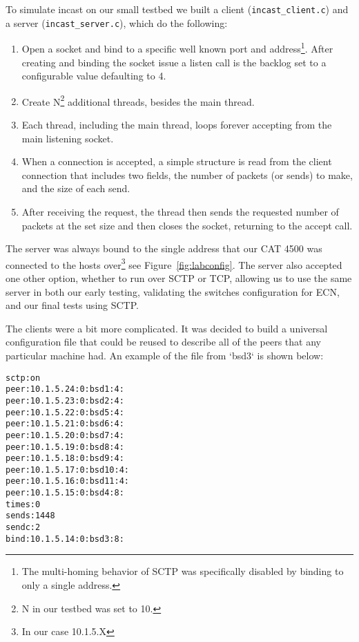 \documentclass[12pt]{article}
\begin{document}
To simulate incast on our small testbed we built a client
(\texttt{incast\_client.c}) and a server (\texttt{incast\_server.c}), 
which  do the following:
\begin{enumerate}

\item Open a socket and bind to a specific well known port and address\footnote{The multi-homing
behavior of SCTP was specifically disabled by binding to only a single address.}. After creating and
binding the socket issue a listen call is the backlog set to a configurable value defaulting to 4.

\item Create N\footnote{N in our testbed was set to 10.} additional threads, besides the main thread.

\item Each thread, including the main thread, loops forever accepting from the main listening socket.

\item When a connection is accepted, a simple structure is read from the client connection that includes two fields, the
number of packets (or sends) to make, and the size of each send.

\item After receiving the request, the thread then sends the requested number of packets at the set
size and then closes the socket, returning to the accept call.

\end{enumerate}

The server
was always bound to the single address that our CAT 4500 was connected to the hosts over\footnote{In our case 10.1.5.X}
see Figure~\ref{fig:labconfig}.
The server also accepted one other option, whether to run over SCTP or
TCP, allowing us to use
the same server in both our early testing, validating the switches configuration for ECN, and our final tests
using SCTP.

The clients were a bit more complicated. It was decided to build a universal 
configuration file that could be reused to describe all of the peers that any
particular machine had. An example of the file from `bsd3` is shown below:

\begin{verbatim}
sctp:on
peer:10.1.5.24:0:bsd1:4:
peer:10.1.5.23:0:bsd2:4:
peer:10.1.5.22:0:bsd5:4:
peer:10.1.5.21:0:bsd6:4:
peer:10.1.5.20:0:bsd7:4:
peer:10.1.5.19:0:bsd8:4:
peer:10.1.5.18:0:bsd9:4:
peer:10.1.5.17:0:bsd10:4:
peer:10.1.5.16:0:bsd11:4:
peer:10.1.5.15:0:bsd4:8:
times:0
sends:1448
sendc:2
bind:10.1.5.14:0:bsd3:8:
\end{verbatim}
\end{document}

